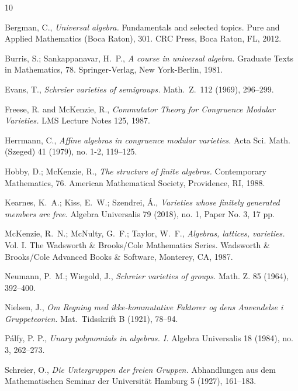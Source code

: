 \documentclass[12pt]{amsart}
\theoremstyle{definition}
\numberwithin{equation}{section}
\begin{document}

\begin{thebibliography}{10}


Bergman, C.,
{\sl Universal algebra.}
Fundamentals and selected topics.
Pure and Applied Mathematics (Boca Raton), 301.
CRC Press, Boca Raton, FL, 2012. 
  
Burris, S.; Sankappanavar, H.~P.,
{\sl A course in universal algebra.}
Graduate Texts in Mathematics, 78. Springer-Verlag, New York-Berlin, 1981.

Evans, T.,
\emph{Schreier varieties of semigroups.}
Math.\ Z.\ 112 (1969), 296--299.

Freese, R. and McKenzie, R.,
{\sl Commutator Theory for Congruence Modular Varieties.}
LMS Lecture Notes 125, 1987.

Herrmann, C.,
\emph{Affine algebras in congruence modular varieties.}
Acta Sci. Math. (Szeged) 41 (1979), no. 1-2, 119--125.
  
Hobby, D.; McKenzie, R.,
{\sl The structure of finite algebras.}
Contemporary Mathematics, 76.
American Mathematical Society, Providence, RI, 1988.
  
Kearnes, K.~A.;
Kiss, E.~W.;
Szendrei, \'{A}.,
\emph{Varieties whose finitely generated members are free.}
Algebra Universalis 79 (2018), no. 1, Paper No. 3, 17 pp.
  
McKenzie, R.~N.; McNulty, G.~F.; Taylor, W.~F.,
{\sl Algebras, lattices, varieties.} Vol. I.
The Wadsworth \& Brooks/Cole Mathematics Series.
Wadsworth \& Brooks/Cole Advanced Books \& Software, Monterey, CA, 1987. 

Neumann, P.~M.;
Wiegold, J.,
\emph{Schreier varieties of groups.} Math. Z. 85 (1964), 392--400.  

Nielsen, J.,
\emph{Om Regning med ikke-kommutative Faktorer og dens Anvendelse i Gruppeteorien.}
Mat.\ Tidsskrift B (1921), 78--94. 

P\'{a}lfy, P. P.,
\emph{Unary polynomials in algebras. I.}
Algebra Universalis 18 (1984), no. 3, 262--273. 

Schreier, O.,
\emph{Die Untergruppen der freien Gruppen.}
Abhandlungen aus dem Mathematischen Seminar
der Universit\"{a}t Hamburg 5 (1927),
161--183.


\end{thebibliography}
\end{document}
